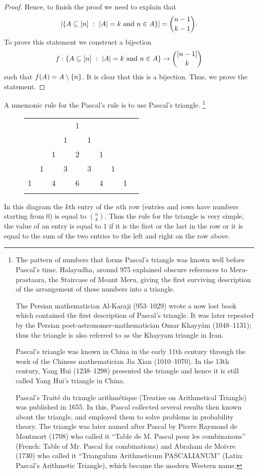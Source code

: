 \begin{proof}
  Hence, to finish the proof we need to explain that
  \[
    \cardinality{\set[\cardinality{A} = k \text{ and } n \in A]{A \subseteq \range{n}}} =
    \binom{n - 1}{k - 1}.
  \]
  To prove this statement we construct a bijection
  \[
    f : \set[\cardinality{A} = k \text{ and } n \in A]{A \subseteq \range{n}} \to
      \subsets[k]{\range{n - 1}}
  \]
  such that $f(A) = A \setminus \set{n}$.
  It is clear that this is a bijection. Thus, we prove the statement.
\end{proof}

A mnemonic rule for the Pascal's rule is to use Pascal's triangle.
\footnote[][-8cm]{
  The pattern of numbers that forms Pascal's triangle was known well before
  Pascal's time.  Halayudha, around 975 explained obscure references to
  Meru-prastaara, the Staircase of Mount Meru, giving the first surviving
  description of the arrangement of these numbers into a triangle.

  The Persian mathematician Al-Karaji (953–1029) wrote a now lost book which
  contained the first description of Pascal's triangle. It was later repeated by
  the Persian poet-astronomer-mathematician Omar Khayyám (1048–1131); thus the
  triangle is also referred to as the Khayyam triangle in Iran.

  Pascal's triangle was known in China in the early 11th century through the
  work of the Chinese mathematician Jia Xian (1010–1070). In the 13th century,
  Yang Hui (1238–1298) presented the triangle and hence it is still called Yang
  Hui's triangle in China.

  Pascal's Traité du triangle arithmétique (Treatise on Arithmetical Triangle)
  was published in 1655. In this, Pascal collected several results then known
  about the triangle, and employed them to solve problems in probability theory.
  The triangle was later named after Pascal by Pierre Raymond de Montmort (1708)
  who called it ``Table de M. Pascal pour les combinaisons'' (French: Table of
  Mr. Pascal for combinations) and Abraham de Moivre (1730) who called it
  ``Triangulum Arithmeticum PASCALIANUM'' (Latin: Pascal's Arithmetic Triangle),
  which became the modern Western name.
}
\begin{figure}
  \centering
  \begin{tabular}{lccccccccc}
    &    &    &    &  1\\\noalign{\smallskip\smallskip}
    &    &    &  1 &    &  1\\\noalign{\smallskip\smallskip}
    &    &  1 &    &  2 &    &  1\\\noalign{\smallskip\smallskip}
    &  1 &    &  3 &    &  3 &    &  1\\\noalign{\smallskip\smallskip}
    1 &    &  4 &    &  6 &    &  4 &    &  1\\\noalign{\smallskip\smallskip}
  \end{tabular}
\end{figure}
In this diagram the $k$th entry of the $n$th row
(entries and rows have numbers starting from $0$) is equal to $\binom{n}{k}$.
Thus the rule for the triangle is very simple, the value of an entry is equal
to $1$ if it is the first or the last in the row or it is equal to the sum
of the two entries to the left and right on the row above.

